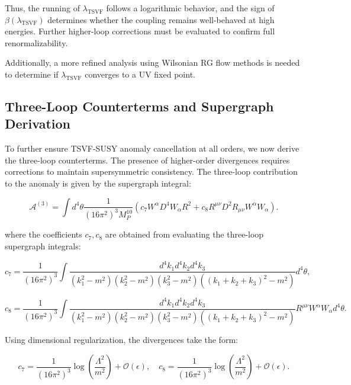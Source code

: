 \documentclass[12pt, onecolumn]{article}
\theoremstyle{definition}
\numberwithin{equation}{section}
\begin{document}
Thus, the running of \( \lambda_{\text{TSVF}} \) follows a logarithmic behavior, and the sign of \( \beta(\lambda_{\text{TSVF}}) \) determines whether the coupling remains well-behaved at high energies. Further higher-loop corrections must be evaluated to confirm full renormalizability.

Additionally, a more refined analysis using Wilsonian RG flow methods is needed to determine if \( \lambda_{\text{TSVF}} \) converges to a UV fixed point.

\subsection{Three-Loop Counterterms and Supergraph Derivation}
\label{subsec:three-loop-counterterms}

To further ensure TSVF-SUSY anomaly cancellation at all orders, we now derive the three-loop counterterms. The presence of higher-order divergences requires corrections to maintain supersymmetric consistency. The three-loop contribution to the anomaly is given by the supergraph integral:

\begin{equation}
    \mathcal{A}^{(3)} = \int d^4\theta \frac{1}{(16\pi^2)^3 M_P^{10}} \left( c_7 W^{\alpha} D^4 W_{\alpha} R^2 + c_8 R^{\mu\nu} D^2 R_{\mu\nu} W^{\alpha} W_{\alpha} \right).
    \label{eq:three-loop-anomaly-supergraph}
\end{equation}

where the coefficients \( c_7, c_8 \) are obtained from evaluating the three-loop supergraph integrals:

\begin{equation}
    c_7 = \frac{1}{(16\pi^2)^3} \int \frac{d^4k_1 d^4k_2 d^4k_3}{(k_1^2 - m^2)(k_2^2 - m^2)(k_3^2 - m^2)((k_1 + k_2 + k_3)^2 - m^2)} d^4\theta,
    \label{eq:c7-integral}
\end{equation}

\begin{equation}
    c_8 = \frac{1}{(16\pi^2)^3} \int \frac{d^4k_1 d^4k_2 d^4k_3}{(k_1^2 - m^2)(k_2^2 - m^2)(k_3^2 - m^2)((k_1 + k_2 + k_3)^2 - m^2)} R^{\mu\nu} W^{\alpha} W_{\alpha} d^4\theta.
    \label{eq:c8-integral}
\end{equation}

Using dimensional regularization, the divergences take the form:

\begin{equation}
    c_7 = \frac{1}{(16\pi^2)^3} \log \left( \frac{\Lambda^2}{m^2} \right) + \mathcal{O}(\epsilon), \quad c_8 = \frac{1}{(16\pi^2)^3} \log \left( \frac{\Lambda^2}{m^2} \right) + \mathcal{O}(\epsilon).
    \label{eq:c7-c8-results}
\end{equation}
\end{document}
